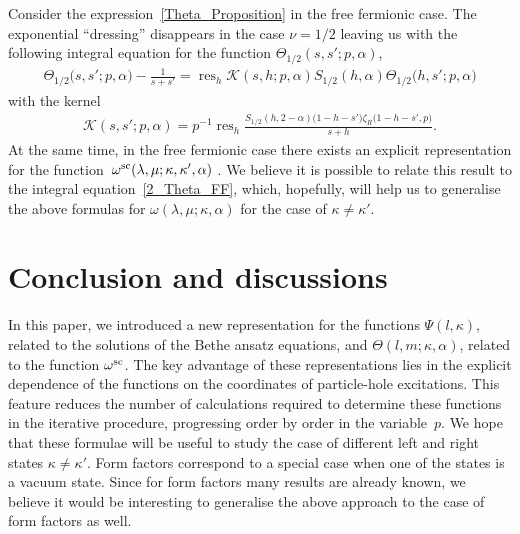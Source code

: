 \documentclass[pdftex]{sigma}
\numberwithin{equation}{section}
\DeclareMathOperator{\res}{res}
\begin{document}
\begin{Remark}
Consider the expression~\eqref{Theta_Proposition} in the free fermionic case. The exponential ``dressing'' disappears in the case $\nu=1/2$ leaving us with the following integral equation for the function $\Theta_{1/2}(s, s'; p, \alpha)$,
\begin{align}\label{2_Theta_FF}
\Theta_{1/2}\bigl(s, s'; p, \alpha\bigr)-\frac{1}{s+s'}=\res_h \mathcal{K}(s, h; p, \alpha) S_{1/2}(h, \alpha) \Theta_{1/2}\bigl(h, s'; p, \alpha\bigr)
\end{align}
with the kernel
\begin{align*}
\mathcal{K}(s, s'; p, \alpha)=p^{-1}\res_h \frac{S_{1/2}(h, 2-\alpha) \bigl(1-h-s'\bigr) \zeta_R\bigl(1-h-s', p\bigr)}{s+h}.
\end{align*}
At the same time, in the free fermionic case there exists an explicit representation for the function~$\omega^{{\rm sc}}(\lambda, \mu; \kappa, \kappa', \alpha)$ \cite{Smirnov_PC}. We believe it is possible to relate this result to the integral equation~\eqref{2_Theta_FF}, which, hopefully, will help us to generalise the above formulas for $\omega(\lambda, \mu; \kappa, \alpha)$ for the case of $\kappa\neq\kappa'$.
\end{Remark}

\section{Conclusion and discussions}
In this paper, we introduced a new representation for the functions $\Psi(l, \kappa)$, related to the solutions of the Bethe ansatz equations, and $\Theta(l, m; \kappa, \alpha)$, related to the function $\omega^{{\rm sc}}$. The key advantage of these representations lies in the explicit dependence of the functions on the coordinates of particle-hole excitations. This feature reduces the number of calculations required to determine these functions in the iterative procedure, progressing order by order in the variable~$p$. We hope that these formulae will be useful to study the case of different left and right states $\kappa\neq\kappa'$. Form factors correspond to a special case when one of the states is a vacuum state. Since for form factors many results are already known, we believe it would be interesting to generalise the above approach to the case of form factors as well.

\appendix
\end{document}
